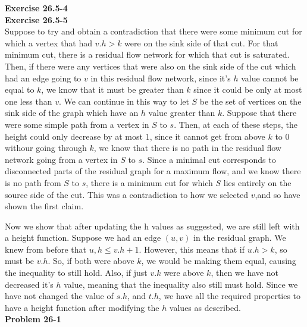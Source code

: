 \documentclass{article}
\begin{document}
\noindent\textbf{Exercise 26.5-4}\\



\noindent\textbf{Exercise 26.5-5}\\

Suppose to try and obtain a contradiction that there were some minimum cut for which a vertex that had $v.h > k$ were on the sink side of that cut. For that minimum cut, there is a residual flow network for which that cut is saturated. Then, if there were any vertices that were also on the sink side of the cut which had an edge going to $v$ in this residual flow network, since it's $h$ value cannot be equal to $k$, we know that it must be greater than $k$ since it could be only at most one less than $v$. We can continue in this way to let $S$ be the set of vertices on the sink side of the graph which have an $h$ value greater than $k$. Suppose that there were some simple path from a vertex in $S$ to $s$. Then, at each of these steps, the height could only decrease by at most $1$, since it cannot get from above $k$ to 0 withour going through $k$, we know that there is no path in the residual flow network going from a vertex in $S$ to $s$. Since a minimal cut corresponds to disconnected parts of the residual graph for a maximum flow, and we know there is no path from $S$ to $s$, there is a minimum cut for which $S$ lies entirely on the source side of the cut. This was a contradiction to how we selected $v$,and so have shown the first claim.

Now we show that after updating the h values as suggested, we are still left with a height function. Suppose we had an edge $(u,v)$ in the residual graph. We knew from before that $u,h \le v.h+1$. However, this means that if $u.h>k$, so must be $v.h$. So, if both were above $k$, we would be making them equal, causing the inequality to still hold. Also, if just $v.k$ were above $k$, then we have not decreased it's $h$ value, meaning that the inequality also still must hold. Since we have not changed the value of $s.h$, and $t.h$, we have all the required properties to have a height function after modifying the $h$ values as described.\\


\noindent\textbf{Problem 26-1}\\
\end{document}
